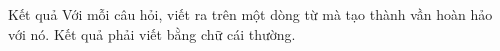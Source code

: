 Kết quả
Với mỗi câu hỏi, viết ra trên một dòng từ mà tạo thành vần hoàn hảo với nó. Kết quả phải viết bằng chữ cái thường.